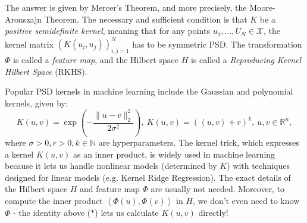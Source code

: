 The answer is given by Mercer's Theorem, and more precisely, the Moore-Aronszajn Theorem. The necessary 
and sufficient condition is that $K$ be a \textit{positive semidefinite kernel}, meaning that for any points 
$u_1, \dots, U_N \in \mathcal{X}$, the kernel matrix $(K(u_i, u_j))_{i, j = 1}^N$ has to be symmetric PSD. 
The transformation $\Phi$ is called a \textit{feature map}, and the Hilbert space $H$ is called a 
\textit{Reproducing Kernel Hilbert Space} (RKHS). 

Popular PSD kernels in machine learning include the Gaussian and polynomial kernels, given by:
\[ K(u, v) = \exp{\left( -\frac{\lVert u - v \rVert_{2}^2}{2 \sigma^2} \right)}, \ 
K(u, v) = (\left\langle u, v \right\rangle + r)^k, \ u, v \in \mathbb{R}^n, \]
where $\sigma > 0, r > 0, k \in \mathbb{N}$ are hyperparameters. The kernel trick, which expresses a kernel 
$K(u, v)$ as an inner product, is widely used in machine learning because it lets us handle nonlinear models 
(determined by $K$) with techniques designed for linear models (e.g. Kernel Ridge Regression). The exact 
details of the Hilbert space $H$ and feature map $\Phi$ are usually not needed. Moreover, to compute the inner 
product $\left\langle \Phi(u), \Phi(v) \right\rangle$ in $H$, we don't even need to know $\Phi$ - the identity 
above ($*$) lets us calculate $K(u, v)$ directly!
